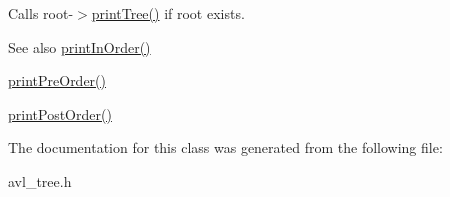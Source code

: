 Calls root-\/$>$\hyperlink{classavl__tree_ae067ad48ed35e1df18fdda1ed83c3d79}{print\+Tree()} if root exists. \begin{DoxySeeAlso}{See also}
\hyperlink{classavl__tree_a524ae6ac5d7f7c2399fb758aba84af80}{print\+In\+Order()} 

\hyperlink{classavl__tree_ac17fa1e4aa2f0f4b609a7b72c34bd2f6}{print\+Pre\+Order()} 

\hyperlink{classavl__tree_a5fb83061648947aeb6b540a5dee7ae13}{print\+Post\+Order()} 
\end{DoxySeeAlso}


The documentation for this class was generated from the following file\+:\begin{DoxyCompactItemize}
\item 
avl\+\_\+tree.\+h\end{DoxyCompactItemize}
